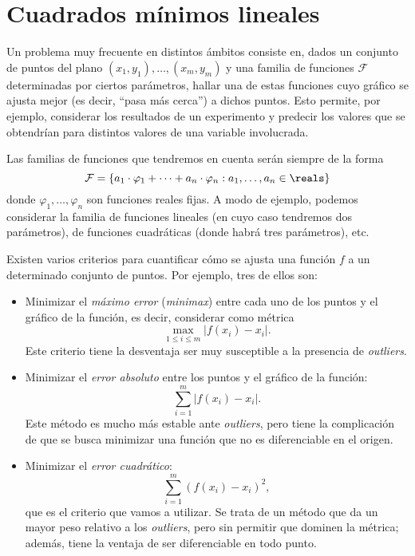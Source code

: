 
\section{Cuadrados mínimos lineales}
\label{section:cml}

Un problema muy frecuente en distintos ámbitos consiste en, dados
un conjunto de puntos del plano $(x_1,y_1), \dots, (x_m,y_m)$ y una familia
de funciones $\mathcal{F}$ determinadas por ciertos parámetros, hallar
una de estas funciones cuyo gráfico se ajusta mejor (es decir, ``pasa más
cerca'') a dichos puntos. Esto permite, por ejemplo, considerar los resultados
de un experimento y predecir los valores que se obtendrían para distintos
valores de una variable involucrada.

Las familias de funciones que tendremos en cuenta serán siempre de la forma
\[ \mathcal{F} = \{ a_1 \cdot \varphi_1 + \dots + a_n \cdot \varphi_n
    : a_1, \dots, a_n \in \reals \} \]
donde $\varphi_1, \dots, \varphi_n$ son funciones reales fijas. A modo de
ejemplo, podemos considerar la familia de funciones lineales (en cuyo caso
tendremos dos parámetros), de funciones cuadráticas (donde habrá tres
parámetros), etc.

Existen varios criterios para cuantificar cómo se ajusta una función $f$ a un
determinado conjunto de puntos. Por ejemplo, tres de ellos son:
\begin{itemize}
\item Minimizar el \emph{máximo error} (\emph{minimax}) entre cada uno de los
    puntos y el gráfico de la función, es decir, considerar como métrica
    \[ \max_{1\leq i \leq m} \left\vert f(x_i) - x_i \right\vert. \]
    Este criterio tiene la desventaja ser muy susceptible a la presencia
    de \emph{outliers}.
\item Minimizar el \emph{error absoluto} entre los puntos y el gráfico de la
    función:
    \[ \sum_{i = 1}^{m} \left\vert f(x_i) - x_i \right\vert. \]
    Este método es mucho más estable ante \emph{outliers}, pero tiene la
    complicación de que se busca minimizar una función que no es
    diferenciable en el origen.
\item Minimizar el \emph{error cuadrático}:
    \[ \sum_{i = 1}^{m} \left( f(x_i) - x_i \right)^2, \]
    que es el criterio que vamos a utilizar. Se trata de un método que da
    un mayor peso relativo a los \emph{outliers}, pero sin permitir que
    dominen la métrica; además, tiene la ventaja de ser diferenciable en todo
    punto.
\end{itemize}

